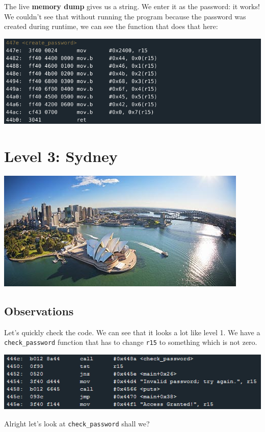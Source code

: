 The live \textbf{memory dump} gives us a string. We enter it as the
password: it works!\\We couldn't see that without running the program
because the password was created during runtime, we can see the function
that does that here:

\includegraphics{img/1_5.png}

\section{Level 3: Sydney}\label{level-3-sydney}

\includegraphics{img/3_2.PNG}

\subsection{Observations}\label{observations}

Let's quickly check the code. We can see that it looks a lot like level
1. We have a \texttt{check\_password} function that has to change
\texttt{r15} to something which is not zero.

\includegraphics{img/2_1.PNG}

Alright let's look at \texttt{check\_password} shall we?

